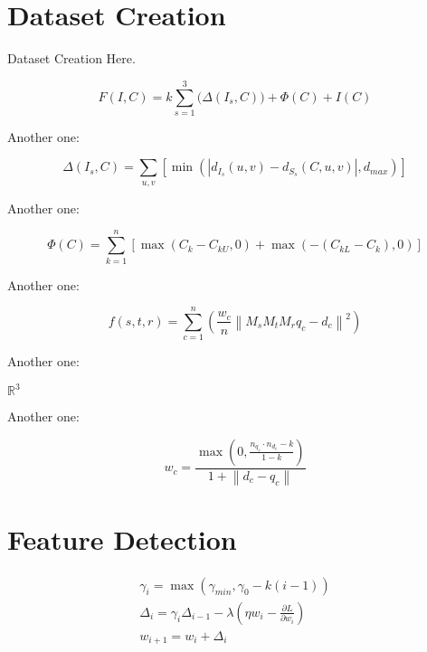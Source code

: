 \documentclass{acmtog}
\begin{document}
\section{Dataset Creation}
\label{sec:datasetcreation}

Dataset Creation Here.

\begin{equation}
F\left(I, C\right)=k\sum_{s=1}^3\bigg(\Delta(I_s, C)\bigg) + \Phi\left(C\right) + I\left(C\right)
\end{equation}

Another one:

\begin{equation}
\Delta\left(I_s,C\right)=\sum_{u,v}\left[\operatorname{min}\left(\left|d_{I_s}(u,v)-d_{S_s}(C,u,v)\right|,d_{max}\right)\right]
\end{equation}

Another one:

\begin{equation}
\textstyle
\Phi\left(C\right) = \sum\limits_{k=1}^n\left[\operatorname{max}\left(C_k-C_{kU}, 0\right) + \operatorname{max}\left(-\left(C_{kL}-C_k\right), 0\right)\right]
\end{equation}

Another one:

\begin{equation}
f(s, t, r) = \sum_{c=1}^n\left(\frac{w_c}{n} \left\|M_s M_t M_r q_c - d_c\right\|^2 \right)
\end{equation}

Another one:

$\mathbb{R}^3$

Another one:

\begin{equation}
w_c = \frac{\operatorname{max}\left(0, \frac{n_{q_c}\cdot n_{d_c} - k}{ 1 - k}\right)}{1 + \left\|d_c-q_c\right\|}
\end{equation}

\section{Feature Detection}
\label{sec:realtimefeaturedetection}

\begin{eqnarray}
\gamma_i = \operatorname{max}\left(\gamma_{min},\gamma_0-k\left(i-1\right)\right) \\
\Delta_i = \gamma_i\Delta_{i-1}-\lambda\left(\eta w_i-\frac{\partial L}{\partial w_i}\right) \\
w_{i+1} = w_i + \Delta_i
\end{eqnarray}
\end{document}
